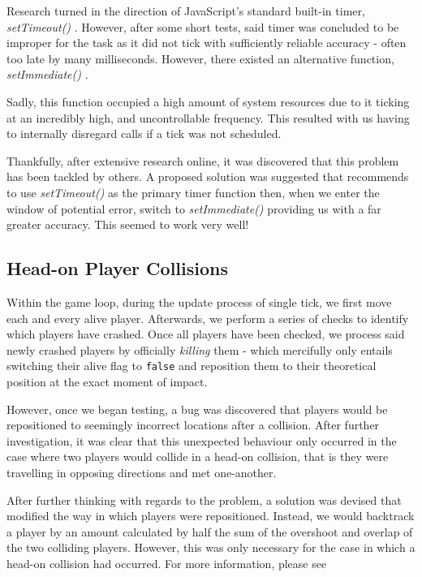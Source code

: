 \documentclass{standalone}
\begin{document}
			Research turned in the direction of JavaScript's standard built-in timer, \emph{setTimeout()} \parencite{JsSetTimeout}. However, after some short tests, said timer was concluded to be improper for the task as it did not tick with sufficiently reliable accuracy - often too late by many milliseconds. However, there existed an alternative function, \emph{setImmediate()} \parencite{JsSetImmediate}. 

			Sadly, this function occupied a high amount of system resources due to it ticking at an incredibly high, and uncontrollable frequency. This resulted with us having to internally disregard calls if a tick was not scheduled.

			Thankfully, after extensive research online, it was discovered that this problem has been tackled by others. A proposed solution \parencite{JsGameLoop} was suggested that recommends to use \emph{setTimeout()} as the primary timer function then, when we enter the window of potential error, switch to \emph{setImmediate()} providing us with a far greater accuracy. This seemed to work very well!

		\subsection{Head-on Player Collisions}
			Within the game loop, during the update process of single tick, we first move each and every alive player. Afterwards, we perform a series of checks to identify which players have crashed. Once all players have been checked, we process said newly crashed players by officially \emph{killing} them - which mercifully only entails switching their alive flag to \texttt{false} and reposition them to their theoretical position at the exact moment of impact.

			However, once we began testing, a bug was discovered that players would be repositioned to seemingly incorrect locations after a collision. After further investigation, it was clear that this unexpected behaviour only occurred in the case where two players would collide in a head-on collision, that is they were travelling in opposing directions and met one-another.

			After further thinking with regards to the problem, a solution was devised that modified the way in which players were repositioned. Instead, we would backtrack a player by an amount calculated by half the sum of the overshoot and overlap of the two colliding players. However, this was only necessary for the case in which a head-on collision had occurred. For more information, please see 
\end{document}
